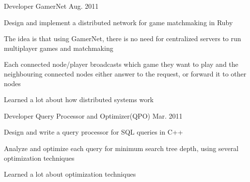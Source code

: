 \begin{cventries}
  \cventry
    {Developer} %
    {GamerNet} %
    {} %
    {Aug. 2011} %
    {
      \begin{cvitems} %
        \item {Design and implement a distributed network for game matchmaking in Ruby}
        \item {The idea is that using GamerNet, there is no need for centralized servers to run multiplayer games and matchmaking}
		\item {Each connected node/player broadcasts which game they want to play and the neighbouring connected nodes either answer to the request, or forward it to other nodes}
		\item {Learned a lot about how distributed systems work}
      \end{cvitems}
    }
	
  \cventry
    {Developer} %
    {Query Processor and Optimizer(QPO)} %
    {} %
    {Mar. 2011} %
    {
      \begin{cvitems} %
        \item {Design and write a query processor for SQL queries in C++}
        \item {Analyze and optimize each query for minimum search tree depth, using several optimization techniques}
		\item {Learned a lot about optimization techniques}
      \end{cvitems}
    }
\end{cventries}
